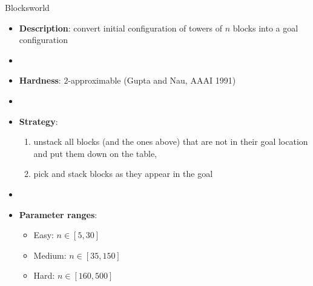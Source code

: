 \documentclass[aspectratio=169,xcolor=dvipsnames]{beamer}
\begin{document}
\begin{frame}{Blocksworld}

    \begin{itemize}
        \item \textbf{Description}: convert initial configuration of towers of $n$ blocks into a goal configuration
        \item[]
        \item \textbf{Hardness}: $2$-approximable (Gupta and Nau, AAAI 1991)
        \item[]
        \item \textbf{Strategy}:
        \begin{enumerate}
            \item unstack all blocks (and the ones above) that are not in their goal location and put them down on the table,
            \item pick and stack blocks as they appear in the goal
        \end{enumerate}
        \item[]
        \item \textbf{Parameter ranges}:
        \begin{itemize}
            \item Easy: $n \in [5, 30]$
            \item Medium: $n \in [35, 150]$
            \item Hard: $n \in [160, 500]$
        \end{itemize}
    \end{itemize}

\end{frame}
\end{document}
